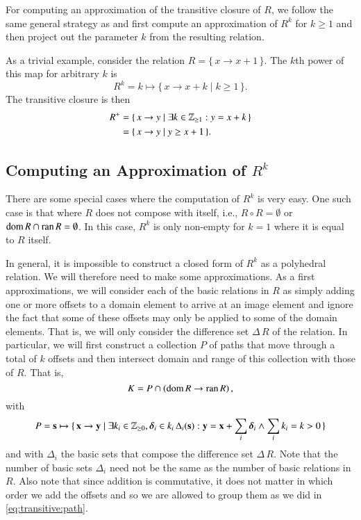 For computing an approximation of the transitive closure of $R$,
we follow the same general strategy as \textcite{Beletska2009}
and first compute an approximation of $R^k$ for $k \ge 1$ and then project
out the parameter $k$ from the resulting relation.

\begin{example}
As a trivial example, consider the relation
$R = \{\, x \to x + 1 \,\}$.  The $k$th power of this map
for arbitrary $k$ is
$$
R^k = k \mapsto \{\, x \to x + k \mid k \ge 1 \,\}
.
$$
The transitive closure is then
$$
\begin{aligned}
R^+ & = \{\, x \to y \mid \exists k \in \mathbb{Z}_{\ge 1} : y = x + k \,\}
\\
& = \{\, x \to y \mid y \ge x + 1 \,\}
.
\end{aligned}
$$
\end{example}

\subsection{Computing an Approximation of $R^k$}
\label{s:power}

There are some special cases where the computation of $R^k$ is very easy.
One such case is that where $R$ does not compose with itself,
i.e., $R \circ R = \emptyset$ or $\mathop{\rm dom}\nolimits R \cap \mathop{\rm ran}\nolimits R = \emptyset$.
In this case, $R^k$ is only non-empty for $k=1$ where it is equal
to $R$ itself.

In general, it is impossible to construct a closed form
of $R^k$ as a polyhedral relation.
We will therefore need to make some approximations.
As a first approximations, we will consider each of the basic
relations in $R$ as simply adding one or more offsets to a domain element
to arrive at an image element and ignore the fact that some of these
offsets may only be applied to some of the domain elements.
That is, we will only consider the difference set $\Delta\,R$ of the relation.
In particular, we will first construct a collection $P$ of paths
that move through
a total of $k$ offsets and then intersect domain and range of this
collection with those of $R$.
That is, 
\begin{equation}
\label{eq:transitive:approx}
K = P \cap \left(\mathop{\rm dom}\nolimits R \to \mathop{\rm ran}\nolimits R\right)
,
\end{equation}
with
\begin{equation}
\label{eq:transitive:path}
P = \vec s \mapsto \{\, \vec x \to \vec y \mid
\exists k_i \in \Z_{\ge 0}, \vec\delta_i \in k_i \, \Delta_i(\vec s) :
\vec y = \vec x + \sum_i \vec\delta_i
\wedge
\sum_i k_i = k > 0
\,\}
\end{equation}
and with $\Delta_i$ the basic sets that compose
the difference set $\Delta\,R$.
Note that the number of basic sets $\Delta_i$ need not be
the same as the number of basic relations in $R$.
Also note that since addition is commutative, it does not
matter in which order we add the offsets and so we are allowed
to group them as we did in \eqref{eq:transitive:path}.

